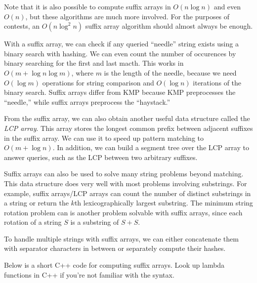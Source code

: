 Note that it is also possible to compute suffix arrays in $O(n \log n)$ and even $O(n)$, but these algorithms are much more involved. For the purposes of contests, an $O(n \log^2 n)$ suffix array algorithm should almost always be enough.

With a suffix array, we can check if any queried ``needle'' string exists using a binary search with hashing. We can even count the number of occurences by binary searching for the first and last macth. This works in $O(m + \log n \log m)$, where $m$ is the length of the needle, because we need $O(\log m)$ operations for string comparison and $O(\log n)$ iterations of the binary search. Suffix arrays differ from KMP because KMP preprocesses the ``needle,'' while suffix arrays preprocess the ``haystack.'' 

From the suffix array, we can also obtain another useful data structure called the \emph{LCP array}. This array stores the longest common prefix between adjacent suffixes in the suffix array. We can use it to speed up pattern matching to $O(m + \log n)$. In addition, we can build a segment tree over the LCP array to answer queries, such as the LCP between two arbitrary suffixes.

Suffix arrays can also be used to solve many string problems beyond matching. This data structure does very well with most problems involving substrings. For example, suffix arrays/LCP arrays can count the number of distinct substrings in a string or return the $k$th lexicographically largest substring. The minimum string rotation problem can is another problem solvable with suffix arrays, since each rotation of a string $S$ is a substring of $S + S$.

To handle multiple strings with suffix arrays, we can either concatenate them with separator characters in between or separately compute their hashes.

Below is a short C++ code for computing suffix arrays. Look up lambda functions in C++ if you're not familiar with the syntax.


